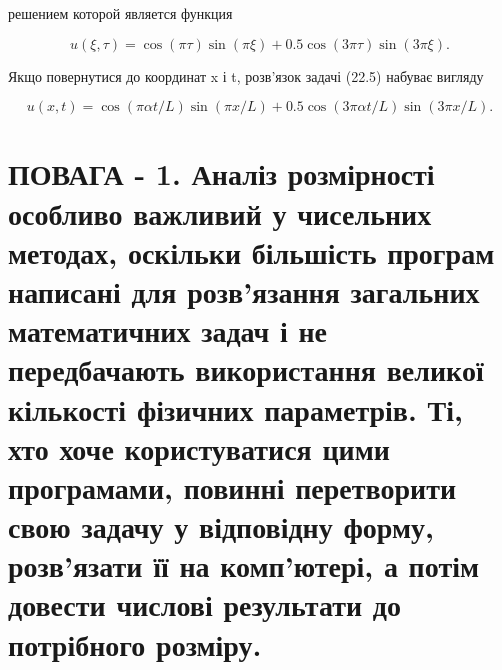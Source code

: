 \documentclass[
  ukrainian,
]{article}
\begin{document}
решением которой является функция

\[
u(\xi, \tau) = \cos(\pi \tau) \sin(\pi \xi) + 0.5 \cos(3\pi \tau) \sin(3\pi \xi).
\]

Якщо повернутися до координат x і t, розв'язок задачі (22.5) набуває
вигляду

\[
u(x, t) = \cos(\pi \alpha t/L)\sin(\pi x/L) + 0.5\cos(3\pi \alpha t/L)\sin(3\pi x/L).
\]

\section{ПОВАГА - 1. Аналіз розмірності особливо важливий у чисельних
методах, оскільки більшість програм написані для розв'язання загальних
математичних задач і не передбачають використання великої кількості
фізичних параметрів. Ті, хто хоче користуватися цими програмами, повинні
перетворити свою задачу у відповідну форму, розв'язати її на комп'ютері,
а потім довести числові результати до потрібного
розміру.}\label{ux43fux43eux432ux430ux433ux430---1.-ux430ux43dux430ux43bux456ux437-ux440ux43eux437ux43cux456ux440ux43dux43eux441ux442ux456-ux43eux441ux43eux431ux43bux438ux432ux43e-ux432ux430ux436ux43bux438ux432ux438ux439-ux443-ux447ux438ux441ux435ux43bux44cux43dux438ux445-ux43cux435ux442ux43eux434ux430ux445-ux43eux441ux43aux456ux43bux44cux43aux438-ux431ux456ux43bux44cux448ux456ux441ux442ux44c-ux43fux440ux43eux433ux440ux430ux43c-ux43dux430ux43fux438ux441ux430ux43dux456-ux434ux43bux44f-ux440ux43eux437ux432ux44fux437ux430ux43dux43dux44f-ux437ux430ux433ux430ux43bux44cux43dux438ux445-ux43cux430ux442ux435ux43cux430ux442ux438ux447ux43dux438ux445-ux437ux430ux434ux430ux447-ux456-ux43dux435-ux43fux435ux440ux435ux434ux431ux430ux447ux430ux44eux442ux44c-ux432ux438ux43aux43eux440ux438ux441ux442ux430ux43dux43dux44f-ux432ux435ux43bux438ux43aux43eux457-ux43aux456ux43bux44cux43aux43eux441ux442ux456-ux444ux456ux437ux438ux447ux43dux438ux445-ux43fux430ux440ux430ux43cux435ux442ux440ux456ux432.-ux442ux456-ux445ux442ux43e-ux445ux43eux447ux435-ux43aux43eux440ux438ux441ux442ux443ux432ux430ux442ux438ux441ux44f-ux446ux438ux43cux438-ux43fux440ux43eux433ux440ux430ux43cux430ux43cux438-ux43fux43eux432ux438ux43dux43dux456-ux43fux435ux440ux435ux442ux432ux43eux440ux438ux442ux438-ux441ux432ux43eux44e-ux437ux430ux434ux430ux447ux443-ux443-ux432ux456ux434ux43fux43eux432ux456ux434ux43dux443-ux444ux43eux440ux43cux443-ux440ux43eux437ux432ux44fux437ux430ux442ux438-ux457ux457-ux43dux430-ux43aux43eux43cux43fux44eux442ux435ux440ux456-ux430-ux43fux43eux442ux456ux43c-ux434ux43eux432ux435ux441ux442ux438-ux447ux438ux441ux43bux43eux432ux456-ux440ux435ux437ux443ux43bux44cux442ux430ux442ux438-ux434ux43e-ux43fux43eux442ux440ux456ux431ux43dux43eux433ux43e-ux440ux43eux437ux43cux456ux440ux443.}
\end{document}
